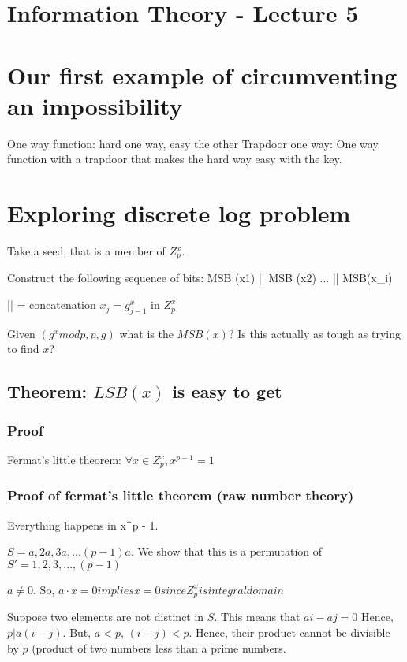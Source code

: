 \section{Information Theory - Lecture 5}
\section{Our first example of circumventing an impossibility}

One way function: hard one way, easy the other
Trapdoor one way: One way function with a trapdoor that makes the hard way easy with the key.

\section{Exploring discrete log problem}

Take a seed, that is a member of $Z_p^x$.

Construct the following sequence of bits: 
MSB (x1) || MSB (x2) ... || MSB(x_i)


|| = concatenation
$x_j =  g^x_{j - 1}$ in $Z_p^x$


Given $(g^x mod p, p, g)$ what is the $MSB(x)$? Is this actually as tough
as trying to find $x$?


\subsection{Theorem: $LSB(x)$ is easy to get}
\subsubsection{Proof}


Fermat's little theorem: $\forall x \in Z_p^x, x^{p - 1} = 1$
\subsubsection{Proof of fermat's little theorem (raw number theory)}
Everything happens in x^{p - 1}.

$S = {a, 2a, 3a, ... (p - 1)a}$.
We show that this is a permutation of
$S' = {1, 2, 3, ..., (p - 1) }$

$a \neq 0$. So, $a \cdot x = 0 implies x = 0 since Z_p^x is integral domain$

Suppose two elements are not distinct in $S$. This means that $ai - aj = 0$
Hence, $p | a(i - j)$. But, $a < p$, $(i - j) < p$. Hence, their product 
cannot be divisible by $p$ (product of two numbers less than a prime numbers.



